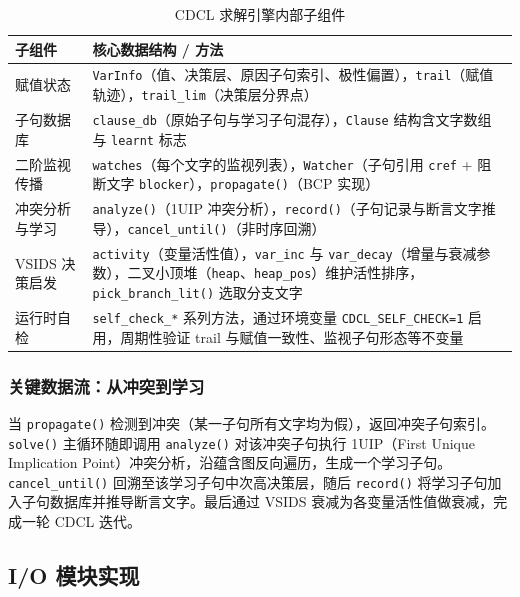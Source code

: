 \documentclass[12pt,a4paper]{article}
\begin{document}
\begin{table}[H]
\centering
\renewcommand{\arraystretch}{1.5}
\begin{tabular}{lp{10cm}}
\toprule
\textbf{子组件} & \textbf{核心数据结构 / 方法} \\
\midrule
赋值状态 & \texttt{VarInfo}（值、决策层、原因子句索引、极性偏置），\texttt{trail}（赋值轨迹），\texttt{trail\_lim}（决策层分界点） \\
\addlinespace
子句数据库 & \texttt{clause\_db}（原始子句与学习子句混存），\texttt{Clause} 结构含文字数组与 \texttt{learnt} 标志 \\
\addlinespace
二阶监视传播 & \texttt{watches}（每个文字的监视列表），\texttt{Watcher}（子句引用 \texttt{cref} + 阻断文字 \texttt{blocker}），\texttt{propagate()}（BCP 实现） \\
\addlinespace
冲突分析与学习 & \texttt{analyze()}（1UIP 冲突分析），\texttt{record()}（子句记录与断言文字推导），\texttt{cancel\_until()}（非时序回溯） \\
\addlinespace
VSIDS 决策启发 & \texttt{activity}（变量活性值），\texttt{var\_inc} 与 \texttt{var\_decay}（增量与衰减参数），二叉小顶堆（\texttt{heap}、\texttt{heap\_pos}）维护活性排序，\texttt{pick\_branch\_lit()} 选取分支文字 \\
\addlinespace
运行时自检 & \texttt{self\_check\_*} 系列方法，通过环境变量 \texttt{CDCL\_SELF\_CHECK=1} 启用，周期性验证 trail 与赋值一致性、监视子句形态等不变量 \\
\bottomrule
\end{tabular}
\caption{CDCL 求解引擎内部子组件}
\label{tab:cdcl_subsystems}
\end{table}

\subsubsection{关键数据流：从冲突到学习}

当 \texttt{propagate()} 检测到冲突（某一子句所有文字均为假），返回冲突子句索引。\texttt{solve()} 主循环随即调用 \texttt{analyze()} 对该冲突子句执行 1UIP（First Unique Implication Point）冲突分析，沿蕴含图反向遍历，生成一个学习子句。\texttt{cancel\_until()} 回溯至该学习子句中次高决策层，随后 \texttt{record()} 将学习子句加入子句数据库并推导断言文字。最后通过 VSIDS 衰减为各变量活性值做衰减，完成一轮 CDCL 迭代。

\subsection{I/O 模块实现}
\end{document}

